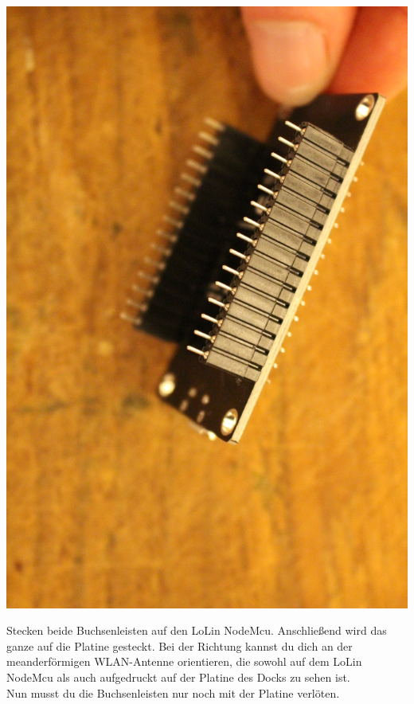 \documentclass{article}
\begin{document}
\begin{minipage}[b]{0.5\textwidth}
	\includegraphics[width=\textwidth]{Bilder2019/IMG_6458.JPG}
\end{minipage}

\vspace{0.5cm}

Stecken beide Buchsenleisten auf den LoLin NodeMcu. Anschließend wird das ganze auf die Platine gesteckt. Bei der Richtung kannst du dich an der meanderförmigen WLAN-Antenne orientieren, die sowohl auf dem LoLin NodeMcu als auch aufgedruckt auf der Platine des Docks zu sehen ist.\\

Nun musst du die Buchsenleisten nur noch mit der Platine verlöten.
\end{document}
